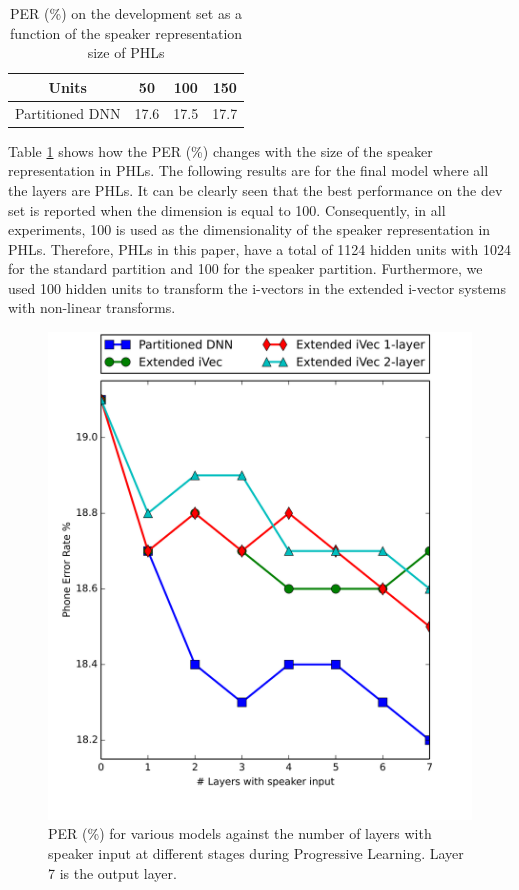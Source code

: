 \documentclass[a4paper]{article}
\begin{document}
  \begin{table}[ht]
  	\caption{PER (\%) on the development set as a function of the speaker representation size of PHLs}
  	\label{tbl:dimensions}
  	\begin{center}
  		\begin{tabular}{|c|c|c|c|}	
  			\hline
  			Units & 50 & 100 & 150  \\
  			\hline
  			\hline
  			Partitioned DNN & 17.6 & 17.5 & 17.7 \\
  			\hline
  		\end{tabular}		
  	\end{center}	
  \end{table}
  
 
 
 Table \ref{tbl:dimensions} shows how the PER (\%) changes with the size of the speaker representation in PHLs. The following results are for the final model where all the layers are PHLs. It can be clearly seen that the best performance on the dev set is reported when the dimension is equal to 100. Consequently, in all experiments, 100 is used as the dimensionality of the speaker representation in PHLs. Therefore, PHLs in this paper, have a total of 1124 hidden units with 1024  for the standard partition and 100 for the speaker partition.  Furthermore, we used 100 hidden units to transform the i-vectors in the extended i-vector systems with non-linear transforms. 
 
 
  \begin{figure}[ht]
  	\includegraphics[width=\linewidth]{compare.png}
  	\caption{PER (\%) for various models against the number of layers with speaker input at different stages  during Progressive Learning. Layer 7 is the output layer.}
  	\label{fig:diagram3}
  \end{figure}
  
\end{document}
